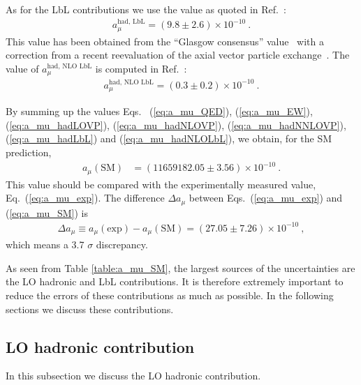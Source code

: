 As for the LbL contributions we use the value
as quoted in Ref.~\cite{KNT18}: 
%
%
\begin{align}
a_\mu^{\text{had, LbL}}= (9.8 \pm 2.6) \times 10^{-10}~.
\label{eq:a_mu_hadLbL}
\end{align}
%
This value has been obtained from the ``Glasgow consensus''
value~\cite{Prades:2009tw} with a correction from a recent reevaluation
of the axial vector particle exchange~\cite{Jegerlehner:2015stw,Pauk:2014rta}.
The value of $a_\mu^{\text{had, NLO LbL}}$ is computed
in Ref.~\cite{Colangelo-etal-NLOLbL}:
%
\begin{align}
a_\mu^{\text{had, NLO LbL}}= (0.3 \pm 0.2) \times 10^{-10}~.
\label{eq:a_mu_hadNLOLbL}
\end{align}

By summing up the values Eqs.~
(\ref{eq:a_mu_QED}), (\ref{eq:a_mu_EW}), (\ref{eq:a_mu_hadLOVP}),
(\ref{eq:a_mu_hadNLOVP}), (\ref{eq:a_mu_hadNNLOVP}),
(\ref{eq:a_mu_hadLbL}) and (\ref{eq:a_mu_hadNLOLbL}), 
we obtain, for the SM prediction, 
%
\begin{align}
 a_\mu(\text{SM}) &= (11 659 182.05 \pm 3.56) \times 10^{-10}~.
\label{eq:a_mu_SM}
\end{align}
%
This value should be compared with the experimentally measured
value, Eq.~(\ref{eq:a_mu_exp}).
The difference $\Delta a_\mu$ between Eqs.~(\ref{eq:a_mu_exp})
and (\ref{eq:a_mu_SM}) is
% 
\begin{align}
 \Delta a_\mu \equiv a_\mu(\text{exp}) - a_\mu(\text{SM})
= (27.05 \pm 7.26) \times 10^{-10}~,
\label{eq:delta_a_mu}
\end{align}
%
which means a 3.7 $\sigma$ discrepancy.

As seen from Table \ref{table:a_mu_SM}, 
the largest sources of the uncertainties are the
LO hadronic and LbL contributions.  It is therefore
extremely important to reduce the errors of these contributions
as much as possible.
In the following sections we discuss these contributions.

\subsection{LO hadronic contribution}

In this subsection we discuss the LO hadronic contribution.

